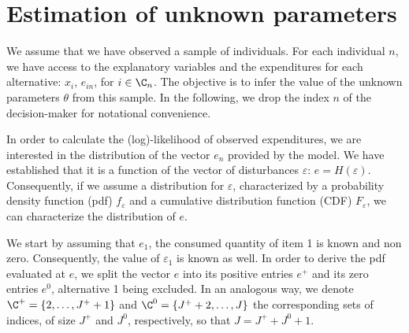 \documentclass[12pt,a4paper]{article}
\begin{document}
\section{Estimation of unknown parameters}
\label{sec:likelihood}

We assume that we have observed a sample of individuals. For each individual $n$, we have access to the explanatory
variables and the expenditures for each alternative: $x_{i}$, $e_{in}$, for $i \in \C_n$. The objective is to infer the
value of the unknown parameters $\theta$ from this sample. In the following, we drop the index $n$ of the decision-maker
for notational convenience.

In order to calculate the (log)-likelihood of observed expenditures, we are interested in the distribution of the vector $e_n$
provided by the model. We have
established that it is a function of the vector of disturbances
$\varepsilon$: $e = H(\varepsilon)$.  Consequently, if we assume
a distribution for $\varepsilon$, characterized by a probability
density function (pdf) $f_\varepsilon$ and a cumulative distribution
function (CDF) $F_\varepsilon$, we can characterize the distribution of $e$.

We start by assuming that $e_{1}$, the consumed quantity of item 1 is
known and non zero. Consequently, the value of $\varepsilon_{1}$ is known as
well. In order to derive the pdf evaluated at $e$, we split the vector $e$ into its positive entries $e^+$ and its
zero entries $e^0$, alternative 1 being excluded. In an analogous way, we denote $\C^+=\{2, \ldots, J^+ +1\}$ and
$\C^0=\{J^{+}+2, \ldots, J\}$
the corresponding sets of indices, of size $J^+$ and $J^0$, respectively, so that $J=J^+ + J^0 + 1$.
\end{document}
